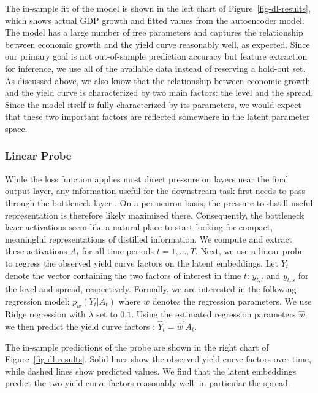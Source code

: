 \documentclass{article}
\theoremstyle{plain}
\theoremstyle{definition}
\theoremstyle{remark}
\begin{document}
The in-sample fit of the model is shown in the left chart of Figure~\ref{fig-dl-results}, which shows actual GDP growth and fitted values from the autoencoder
model. The model has a large number of free parameters and captures the relationship between economic growth and the yield curve reasonably well, as expected. Since our primary goal is not out-of-sample prediction accuracy but feature extraction for inference, we use all of the available data instead of reserving a hold-out set. As discussed above, we also know that the relationship between economic growth and the yield curve is characterized by two main factors: the level and the spread. Since the model itself is fully characterized by its parameters, we would expect that these two important factors are reflected somewhere in the latent parameter space. 

\subsubsection{Linear Probe}\label{linear-probe}

While the loss function applies most direct pressure on layers near the final output layer, any information useful for the downstream task first needs to pass through the bottleneck layer \citep{alain2018understanding}. On a per-neuron basis, the pressure to distill useful representation is therefore likely maximized there. Consequently, the bottleneck layer activations seem like a natural place to start looking for compact, meaningful representations of distilled information.  We compute and extract these activations \(A_t\) for all time periods \(t=1,...,T\). Next, we use a linear probe to regress the observed
yield curve factors on the latent embeddings. Let \(Y_t\) denote the vector containing the two factors of interest in time \(t\): \(y_{t,l}\) and \(y_{t,s}\) for the level and spread, respectively. Formally, we are interested in the following regression model: \(p_{w}(Y_t|A_t)\) where \(w\) denotes the regression
parameters. We use Ridge regression with \(\lambda\) set to \(0.1\). Using the estimated regression parameters \(\hat{w}\), we then predict the yield curve factors%
: \(\hat{Y}_t=\hat{w}^{\prime}A_t\).

The in-sample predictions of the probe are shown in the right chart of Figure~\ref{fig-dl-results}. Solid lines show the observed yield curve factors over time, while dashed lines show predicted values. We find that the latent embeddings predict the two yield curve factors reasonably well, in particular the spread. %
\end{document}
